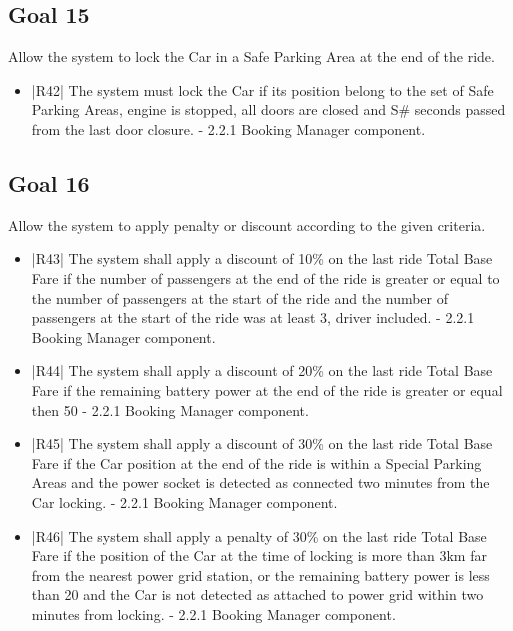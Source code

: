 \subsection {Goal 15} Allow the system to lock the Car in a Safe Parking Area at the end of the ride.
\begin{itemize}
 \item |R42| The system must lock the Car if its position belong to the set of Safe Parking
Areas, engine is stopped, all doors are closed and S\# seconds passed from the
last door closure.
    \newline - 2.2.1 Booking Manager component.
\end{itemize}

\subsection {Goal 16} Allow the system to apply penalty or discount according to the given criteria.
\begin{itemize}
 \item |R43| The system shall apply a discount of 10\% on the last ride Total Base Fare
if the number of passengers at the end of the ride is greater or equal to the
number of passengers at the start of the ride and the number of passengers at
the start of the ride was at least 3, driver included.
    \newline - 2.2.1 Booking Manager component.   
 \item |R44| The system shall apply a discount of 20\% on the last ride Total Base Fare if
the remaining battery power at the end of the ride is greater or equal then
50%
    \newline - 2.2.1 Booking Manager component.
 \item |R45| The system shall apply a discount of 30\% on the last ride Total Base Fare if
the Car position at the end of the ride is within a Special Parking Areas and
the power socket is detected as connected two minutes from the Car locking.
    \newline - 2.2.1 Booking Manager component.
 \item |R46| The system shall apply a penalty of 30\% on the last ride Total Base Fare if
the position of the Car at the time of locking is more than 3km far from the
nearest power grid station, or the remaining battery power is less than 20%
and the Car is not detected as attached to power grid within two minutes
from locking.
    \newline - 2.2.1 Booking Manager component.
\end{itemize}

